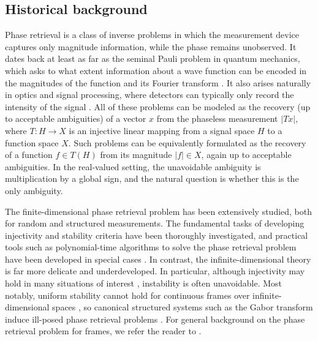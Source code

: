 \documentclass[11pt]{amsart}
\numberwithin{equation}{section}
\theoremstyle{definition}
\theoremstyle{remark}
\begin{document}
\subsection{Historical background} Phase retrieval is a class of inverse problems in which the measurement device captures only magnitude information, while the phase remains unobserved. It dates back at least as far as the seminal Pauli problem in quantum mechanics, which asks to what extent information about a wave function can be encoded in the magnitudes of the function and its Fourier transform \cite{MR3552875,MR3256781,pauli1933allgemeinen,ramos-sousa-pauli}. It also arises naturally in optics and signal processing, where detectors can typically only record  the  intensity of the signal \cite{MR3069958,eldar2014stability,grohs2020survey,sanz1984phase}. All of these problems can be modeled as the recovery (up to acceptable ambiguities) of a vector $x$ from the phaseless measurement $|Tx|$, where $T: H \to X$ is an injective linear mapping from a signal space $H$ to a function space $X$. Such problems can be equivalently formulated as the recovery of a function $f\in T(H)$ from its magnitude $|f|\in X$, again up to acceptable ambiguities. In the real-valued setting, the unavoidable
ambiguity is multiplication by a global sign, and the natural question is whether
this is the only ambiguity.  

The finite-dimensional phase retrieval problem has been extensively studied, both for random and structured measurements. The fundamental tasks of developing injectivity and stability criteria have been thoroughly investigated, and practical tools such as polynomial-time algorithms to solve the phase retrieval problem
have been developed in special cases \cite{bandeira2014saving,MR3260258,MR3069958,DB,eldar2014stability,MR3746047,KS}.
In contrast, the infinite-dimensional theory is far more delicate and underdeveloped. In particular, although injectivity may hold in many situations of interest \cite{cahill2016infinite,freeman2025cahill}, instability is often unavoidable. Most notably, uniform stability cannot hold for continuous
frames over infinite-dimensional spaces \cite{AG-continuous-frames}, so canonical structured systems
such as the Gabor transform induce ill-posed phase retrieval problems
\cite{alaifari2021gabor,alaifari2025cheeger,grohs2021stable,steinerberger2020stability}. For general background on the phase retrieval problem for frames, we refer the reader to \cite{grohs2020survey}.
\end{document}
